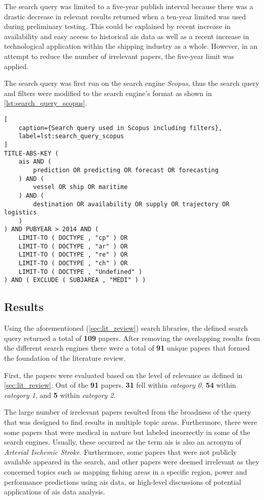 The search query was limited to a five-year publish interval because there was a drastic decrease in relevant results returned when a ten-year limited was used during preliminary testing. This could be explained by recent increase in availability and easy access to historical \acrshort{ais} data as well as a recent increase in technological application within the shipping industry as a whole. However, in an attempt to reduce the number of irrelevant papers, the five-year limit was applied.

The search query was first run on the search engine \textit{Scopus}, thus the search query and filters were modified to the search engine's format as shown in \cref{lst:search_query_scopus}.

\begin{lstlisting}[
    caption={Search query used in Scopus including filters},
    label=lst:search_query_scopus
]
TITLE-ABS-KEY (
    ais AND (
        prediction OR predicting OR forecast OR forecasting
    ) AND (
        vessel OR ship OR maritime
    ) AND (
        destination OR availability OR supply OR trajectory OR logistics
    )
) AND PUBYEAR > 2014 AND (
    LIMIT-TO ( DOCTYPE , "cp" ) OR
    LIMIT-TO ( DOCTYPE , "ar" ) OR
    LIMIT-TO ( DOCTYPE , "re" ) OR
    LIMIT-TO ( DOCTYPE , "ch" ) OR
    LIMIT-TO ( DOCTYPE , "Undefined" )
) AND ( EXCLUDE ( SUBJAREA , "MEDI" ) )
\end{lstlisting}

\subsection{Results}
\label{sec:lit_results}

Using the aforementioned (\cref{sec:lit_review}) search libraries, the defined search query returned a total of \textbf{109} papers. After removing the overlapping results from the different search engines there were a total of \textbf{91} unique papers that formed the foundation of the literature review.

First, the papers were evaluated based on the level of relevance as defined in \cref{sec:lit_review}. Out of the \textbf{91} papers, \textbf{31} fell within \textit{category 0}, \textbf{54} within \textit{category 1}, and \textbf{5} within \textit{category 2}.

The large number of irrelevant papers resulted from the broadness of the query that was designed to find results in multiple topic areas. Furthermore, there were some papers that were medical in nature but labeled incorrectly in some of the search engines. Usually, these occurred as the term \acrshort{ais} is also an acronym of \textit{Arterial Ischemic Stroke}. Furthermore, some papers that were not publicly available appeared in the search, and other papers were deemed irrelevant as they concerned topics such as mapping fishing areas in a specific region, power and performance predictions using \acrshort{ais} data, or high-level discussions of potential applications of \acrshort{ais} data analysis.

